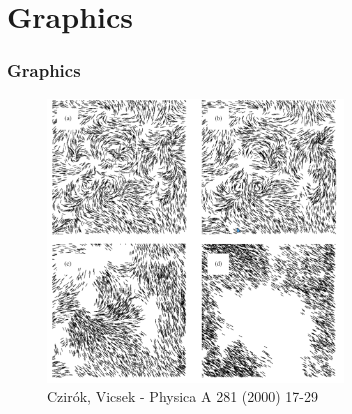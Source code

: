 \documentclass{beamer}
\begin{document}
\section{Graphics}
\begin{frame}
	\frametitle{Graphics}
	\begin{figure}[H]
	\caption{Czirók, Vicsek - Physica A 281 (2000) 17-29}
	\includegraphics[width=0.7\textwidth, height=0.7\textheight]{images/wyniki.png}
	\end{figure}	
\end{frame}
\end{document}

